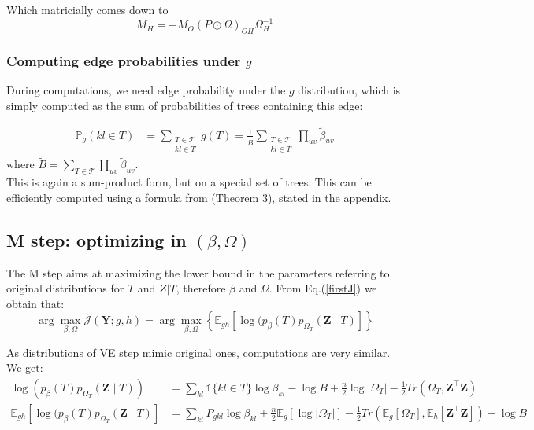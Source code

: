 \documentclass[11pt,a4paper]{article}
\newcommand{\argmax}{\arg\!\max}
\newcommand{\Ybf}{\boldsymbol{Y}}
\newcommand{\Zbf}{\boldsymbol{Z}}
\newcommand{\Esp}{\mathds{E}}
\begin{document}
Which  matricially comes down to
$$\boxed{ M_H = -M_O(P\odot\Omega)_{OH} \Omega_H^{-1}}$$

\subsubsection{Computing edge probabilities under $g$}
During computations, we need edge probability under the $g$ distribution, which is simply computed as the sum of probabilities of trees containing this edge:

\begin{align*}
\mathds{P}_g(kl \in T)  &= \sum_{\substack{T  \in \mathcal{T} \\ kl \in T }} g(T) =\frac{1}{\widetilde{B}} \sum_{\substack{T  \in \mathcal{T} \\ kl \in T }} \prod_{uv} \widetilde{\beta}_{uv}
\end{align*}
where $\widetilde{B}= \sum_{T \in \mathcal{T} }\prod_{uv}  \widetilde{\beta}_{uv}$.\\

 This is again a sum-product form, but on a special set of trees. This can be efficiently computed using a formula from \citet{kirshner} (Theorem 3), stated in the appendix.
 
\subsection{M step: optimizing in $(\beta, \Omega)$}
 The M step aims at maximizing the lower bound in the parameters referring to original distributions for $T$ and $Z|T$, therefore $\beta$ and $\Omega$. From Eq.(\ref{firstJ}) we obtain that: 
$$ \argmax_{\beta, \Omega} \mathcal{J}(\Ybf ; g,h) =\argmax_{\beta, \Omega} \left\{ \Esp_{gh} [\log (p_\beta(T)p_{\Omega_T}(\Zbf\mid T) ]\right\} $$

As distributions of VE step mimic original ones, computations are very similar. We get:
\begin{align*}
\log (p_\beta(T)p_{\Omega_T}(\Zbf\mid T))  &= \sum_{kl} \mathds{1}\{kl \in T\} \log \beta_{kl} - \log B + \frac{n}{2}\log |\Omega_T| - \frac{1}{2}Tr(\Omega_T,\Zbf^\intercal \Zbf)\\
\Esp_{gh} [\log (p_\beta(T)p_{\Omega_T}(\Zbf\mid T) ] &= \sum_{kl} P_{gkl} \log\beta_{kl} +\frac{n}{2} \Esp_g[\log |\Omega_T|] -\frac{1}{2} Tr(\Esp_g [\Omega_T], \Esp_h[\Zbf^\intercal \Zbf])- \log B
\end{align*}
\end{document}
